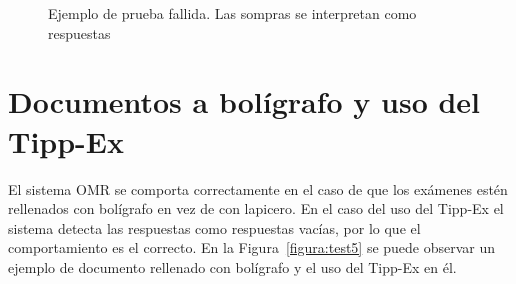 \documentclass[a4paper, 12pt]{book}
\begin{document}
\begin{figure}
  \centering
  \caption{Ejemplo de prueba fallida. Las sompras se interpretan como respuestas}
  \label{figura:test4}
\end{figure}

\section{Documentos a bolígrafo y uso del Tipp-Ex}
\label{sec:boli_tipex}

El sistema OMR se comporta correctamente en el caso de que los exámenes estén
rellenados con bolígrafo en vez de con lapicero. En el caso del uso del
Tipp-Ex el sistema detecta las respuestas como respuestas vacías, por lo
que el comportamiento es el correcto.
En la Figura~\ref{figura:test5} se
puede observar un ejemplo
de documento rellenado con bolígrafo y el uso del Tipp-Ex en él.
\end{document}
